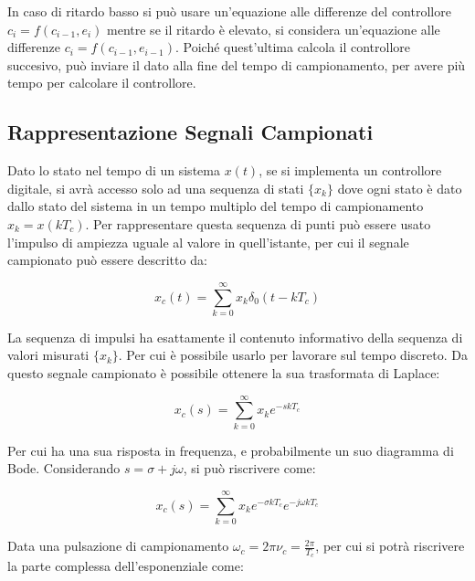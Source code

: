\documentclass{article}
\numberwithin{equation}{subsection}
\begin{document}
\begin{center}
    \begin{tikzpicture}
        
    \end{tikzpicture}
\end{center}

In caso di ritardo basso si può usare un'equazione alle differenze del controllore $c_i=f(c_{i-1},e_i)$ mentre se il ritardo è elevato, si considera un'equazione alle differenze 
$c_i=f(c_{i-1},e_{i-1})$. Poiché quest'ultima calcola il controllore succesivo, può inviare il dato alla fine del tempo di campionamento, per avere più tempo per calcolare il 
controllore. 

\subsection{Rappresentazione Segnali Campionati}

Dato lo stato nel tempo di un sistema $x(t)$, se si implementa un controllore digitale, si avrà accesso solo ad una sequenza di stati $\{x_k\}$ dove ogni stato è dato dallo 
stato del sistema in un tempo multiplo del tempo di campionamento $x_k=x(kT_c)$. Per rappresentare questa sequenza di punti può essere usato l'impulso di ampiezza 
uguale al valore in quell'istante, per cui il segnale campionato può essere descritto da:

\begin{equation}
    x_c(t)=\sum_{k=0}^{\infty}x_k\delta_0(t-kT_c)
\end{equation}

La sequenza di impulsi ha esattamente il contenuto informativo della sequenza di valori misurati $\{x_k\}$. Per cui è possibile usarlo per lavorare sul tempo discreto. 
Da questo segnale campionato è possibile ottenere la sua trasformata di Laplace:

\begin{equation}
    x_c(s)=\sum_{k=0}^{\infty}\displaystyle{x_k}e^{-skT_c}
\end{equation}

Per cui ha una sua risposta in frequenza, e probabilmente un suo diagramma di Bode. Considerando $s=\sigma +j\omega$, si può riscrivere come: 

\begin{equation}
    x_c(s)=\sum_{k=0}^{\infty}x_ke^{-\sigma kT_c}e^{-j\omega kT_c}
\end{equation}

Data una pulsazione di campionamento $\omega_c=2\pi\nu_c=\displaystyle\frac{2\pi}{T_c}$, per cui si potrà riscrivere la parte complessa dell'esponenziale come:
\end{document}
